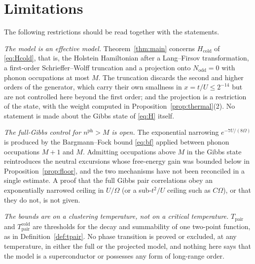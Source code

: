 \documentclass[11pt]{article}
\theoremstyle{plain}
\theoremstyle{definition}
\newcommand{\Nodd}{N_{\mathrm{odd}}}
\begin{document}
\section{Limitations}\label{sec:limits}

The following restrictions should be read together with the statements.

\emph{The model is an effective model.} Theorem~\ref{thm:main} concerns
$H_{\mathrm{cold}}$ of \eqref{eq:Hcold}, that is, the Holstein Hamiltonian after a
Lang--Firsov transformation, a first-order Schrieffer--Wolff truncation and a
projection onto $\Nodd=0$ with phonon occupations at most $M$. The truncation
discards the second and higher orders of the generator, which carry their own
smallness in $x=t/U\le2^{-14}$ but are not controlled here beyond the first order;
and the projection is a restriction of the state, with the weight computed in
Proposition~\ref{prop:thermal}(2). No statement is made about the Gibbs state of
\eqref{eq:H} itself.

\emph{The full-Gibbs control for $n^{\mathrm{ph}}>M$ is open.} The exponential
narrowing $e^{-7U/(8\Omega)}$ is produced by the Bargmann--Fock bound
\eqref{eq:bf} applied between phonon occupations $M+1$ and $M$. Admitting
occupations above $M$ in the Gibbs state reintroduces the neutral excursions whose
free-energy gain was bounded below in Proposition~\ref{prop:floor}, and the two
mechanisms have not been reconciled in a single estimate. A proof that the full
Gibbs pair correlations obey an exponentially narrowed ceiling in $U/\Omega$ (or
a sub-$t^{2}/U$ ceiling such as $C\Omega$), or that they do not, is not given.

\emph{The bounds are on a clustering temperature, not on a critical temperature.}
$T_{\mathrm{pair}}$ and $T^{\mathrm{cold}}_{\mathrm{pair}}$ are thresholds for the
decay and summability of one two-point function, as in
Definition~\ref{def:tpair}. No phase transition is proved or excluded, at any
temperature, in either the full or the projected model, and nothing here says that
the model is a superconductor or possesses any form of long-range order.
\end{document}
